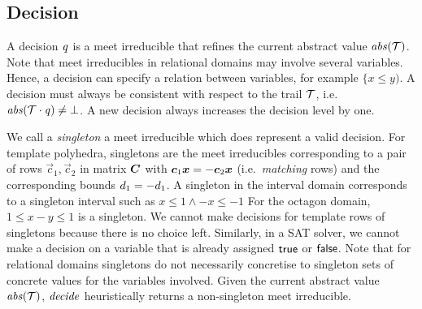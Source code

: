 \subsection{Decision}
A decision $\mathit{q}$ is a meet irreducible that refines the
current abstract value $\mathit{abs}(\mathcal{T})$.  Note that meet irreducibles in
relational domains may involve several variables.
%
%
Hence, a decision can specify a relation between variables, for example 
$\{x \leq y)$.  A decision must always be consistent with respect to 
the trail $\mathcal{T}$, i.e.\ $\mathit{abs}(\mathcal{T}\cdot \mathit{q})\neq \bot$.  
A new decision always increases the decision level by one. 

We call a \emph{singleton} a meet irreducible which does represent a
valid decision.
%
For template polyhedra, singletons are the meet irreducibles
corresponding to a pair of rows $\vec{c}_1,\vec{c}_2$ in matrix
${\boldsymbol C}$ with ${\boldsymbol c}_1{\boldsymbol {x}}=-{\boldsymbol c}_2{\boldsymbol {x}}$
(i.e.\ \emph{matching} rows) and the corresponding bounds
$d_1=-d_1$.
%
A singleton in the interval domain corresponds to a singleton interval
such as $x\leq 1 \wedge -x\leq -1$ For the octagon domain, $1 \leq x-y
\leq 1$ is a singleton.
%
We cannot make decisions for template rows of singletons because there
is no choice left. Similarly, in a SAT solver, we cannot make a
decision on a variable that is already assigned $\mathsf{true}$ or $\mathsf{false}$.
%
Note that for relational domains singletons do not necessarily
concretise to singleton sets of concrete values for the variables
involved.
%
Given 
the current abstract value $\mathit{abs}(\mathcal{T})$, $\mathit{decide}$ heuristically
returns a non-singleton meet irreducible.

